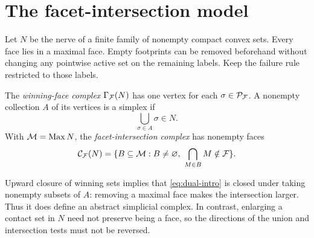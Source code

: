 \section{The facet-intersection model}
\label{sec:duality}
Let $N$ be the nerve of a finite family of nonempty compact convex sets. Every face lies in a maximal face. Empty footprints can be removed beforehand without changing any pointwise active set on the remaining labels. Keep the failure rule restricted to those labels.

\begin{definition}
The \emph{winning-face complex} $\Gamma_{\mathcal F}(N)$ has one vertex for each $\sigma\in\mathcal P_{\mathcal F}$. A nonempty collection $A$ of its vertices is a simplex if
\begin{equation}\label{eq:Gamma}
\bigcup_{\sigma\in A}\sigma\in N.
\end{equation}
With $\mathcal M=\operatorname{Max} N$, the \emph{facet-intersection complex} has nonempty faces
\begin{equation}\label{eq:dual-intro}
\mathcal C_{\mathcal F}(N)=\{B\subseteq\mathcal M:B\ne\varnothing,\ \bigcap_{M\in B}M\notin\mathcal F\}.
\end{equation}
\end{definition}
Upward closure of winning sets implies that \cref{eq:dual-intro} is closed under taking nonempty subsets of $A$: removing a maximal face makes the intersection larger. Thus it does define an abstract simplicial complex. In contrast, enlarging a contact set in $N$ need not preserve being a face, so the directions of the union and intersection tests must not be reversed.


